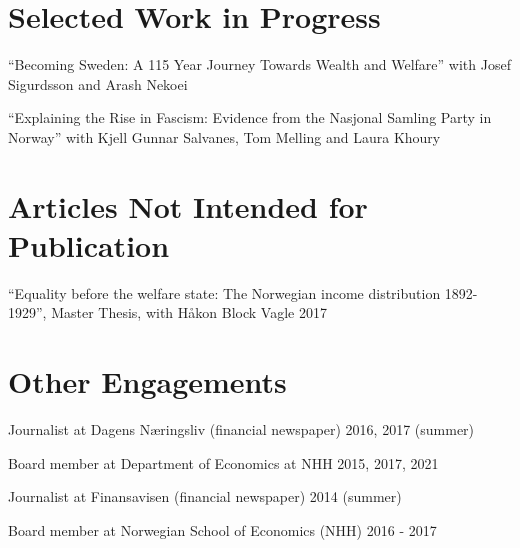 \documentclass[11pt,]{article}
\begin{document}
\vspace{0.5cm}

\hypertarget{selected-work-in-progress}{%
\section{Selected Work in Progress}\label{selected-work-in-progress}}

``Becoming Sweden: A 115 Year Journey Towards Wealth and Welfare'' with
Josef Sigurdsson and Arash Nekoei\vspace{-0.2cm}

``Explaining the Rise in Fascism: Evidence from the Nasjonal Samling
Party in Norway'' with Kjell Gunnar Salvanes, Tom Melling and Laura
Khoury\vspace{-0.2cm}

\vspace{0.5cm}

\hypertarget{articles-not-intended-for-publication}{%
\section{Articles Not Intended for
Publication}\label{articles-not-intended-for-publication}}

``Equality before the welfare state: The Norwegian income distribution
1892-1929'', Master Thesis, with Håkon Block Vagle
\hfill 2017\vspace{-0.2cm}

\vspace{0.5cm}

\hypertarget{other-engagements}{%
\section{Other Engagements}\label{other-engagements}}

Journalist at Dagens Næringsliv (financial newspaper) \hfill 2016, 2017
(summer)\vspace{-0.2cm}

Board member at Department of Economics at NHH \hfill 2015, 2017,
2021\vspace{-0.2cm}

Journalist at Finansavisen (financial newspaper) \hfill 2014
(summer)\vspace{-0.2cm}

Board member at Norwegian School of Economics (NHH) \hfill 2016 -
2017\vspace{-0.2cm}

\vspace{0.5cm}
\end{document}
